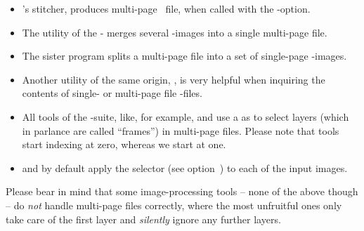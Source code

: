 \begin{itemize}
\item
  's stitcher, 
  produces multi-page ~file, when called with the -option.

\item
  The utility  of the
  - merges several
  -images into a single multi-page file.

\item
  The sister program  splits a
  multi-page file into a set of single-page -images.

\item
  Another utility of the same origin, , is
  very helpful when inquiring the contents of single- or multi-page file -files.

\item
  All tools of the -suite, like, for example,
   and  use a
   as \App{} to select layers
  (which in  parlance are called ``frames'') in multi-page files.
  Please note that  tools start indexing at zero, whereas we start at
  one.

\item
  \App{} and \OtherApp{} by default apply the  selector (see
  option~) to each of the input
  images.
\end{itemize}

Please bear in mind that some image-processing tools -- none of the above though -- do
\emph{not} handle multi-page files correctly, where the most unfruitful ones only take care of
the first layer and \emph{silently} ignore any further layers.



